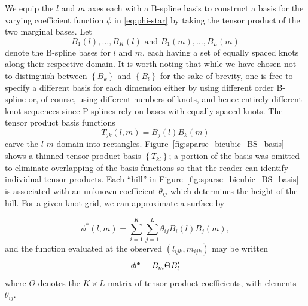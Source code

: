 \documentclass[12pt]{article}
\newcommand{\vphistar}{\mbox{\boldmath $\phi^*$}}
\theoremstyle{definition}
\begin{document}
We equip the $l$ and $m$ axes each with a B-spline basis to construct a basis for the varying coefficient function $\phi$ in \ref{eq:phi-star} by taking the tensor product of the two marginal bases. Let 
\[
B_{1}\left(l\right),\dots, B_{K}\left(l\right)  \mbox{ and } B_{1}\left(m\right),\dots, B_{L}\left(m\right)
\]
denote the B-spline bases for $l$ and $m$, each having a set of equally spaced knots along their respective domain. It is worth noting that while we have chosen not to distinguish between $\left\{ B_k \right\}$ and $\left\{ {B}_l \right\}$ for the sake of brevity, one is free to specify a different basis for each dimension either by using different order B-spline or, of course, using different numbers of knots, and hence entirely different knot sequences since P-splines rely on bases with equally spaced knots. The tensor product basis functions
\begin{equation*}
T_{jk}\left(l,m\right) = B_j\left(l\right){B}_k\left(m\right)
\end{equation*}
\noindent
carve the $l$-$m$ domain into rectangles.  Figure~\ref{fig:sparse_bicubic_BS_basis} shows a thinned tensor product basis $\left\{ T_{kl} \right\}$; a portion of the basis was omitted to eliminate overlapping of the basis functions so that the reader can identify individual tensor products. Each ``hill'' in Figure~\ref{fig:sparse_bicubic_BS_basis} is associated with an unknown coefficient $\theta_{ij}$ which determines the height of the hill. For a given knot grid, we can approximate a surface by

\begin{equation} \label{eq:varying-coefficient-tensor-product-expansion}
\phi^*\left(l,m\right) = \sum_{i=1}^K \sum_{j=1}^L \theta_{ij} B_{i}\left(l\right) B_{j}\left(m\right), 
\end{equation}
\noindent
and the function evaluated at the observed $\left(l_{ijk}, m_{ijk}\right)$ may be written 
\begin{equation*} 
\vphistar = B_m \Theta B_l^\prime
\end{equation*}
\noindent 
where $\Theta$ denotes the $K \times L$ matrix of tensor product coefficients, with elements $\theta_{ij}$.
\end{document}
